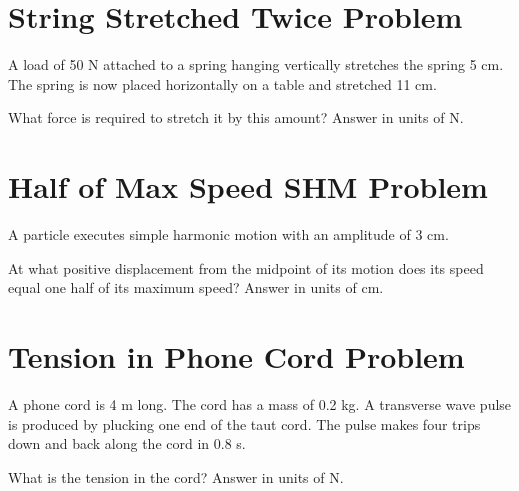 \documentclass[../physics12.tex]{subfiles}
\begin{document}
\section{String Stretched Twice Problem}
A load of 50 N attached to a spring hanging vertically stretches the spring 5 cm. The spring is now placed horizontally on a table and stretched 11 cm.

What force is required to stretch it by this amount? Answer in units of N.

\section{Half of Max Speed SHM Problem}
A particle executes simple harmonic motion with an amplitude of 3 cm. 

At what positive displacement from the midpoint of its motion does its speed equal one half of its maximum speed? Answer in units of cm.

\section{Tension in Phone Cord Problem}
A phone cord is 4 m long. The cord has a mass of 0.2 kg. A transverse wave pulse is produced by plucking one end of the taut cord.
The pulse makes four trips down and back along the cord in 0.8 s.

What is the tension in the cord? Answer in units of N.
\end{document}

